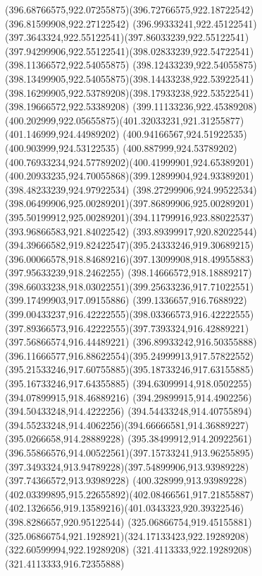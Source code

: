{{{{				\curveto(396.68766575,922.07255875)(396.72766575,922.18722542)(396.81599908,922.27122542)
				\curveto(396.99333241,922.45122541)(397.3643324,922.55122541)(397.86033239,922.55122541)
				\curveto(397.94299906,922.55122541)(398.02833239,922.54722541)(398.11366572,922.54055875)
				\curveto(398.12433239,922.54055875)(398.13499905,922.54055875)(398.14433238,922.53922541)
				\curveto(398.16299905,922.53789208)(398.17933238,922.53522541)(398.19666572,922.53389208)
				\curveto(399.11133236,922.45389208)(400.202999,922.05655875)(401.32033231,921.31255877)
				\lineto(401.146999,924.44989202)
				\lineto(400.94166567,924.51922535)
				\lineto(400.903999,924.53122535)
				\curveto(400.887999,924.53789202)(400.76933234,924.57789202)(400.41999901,924.65389201)
				\curveto(400.20933235,924.70055868)(399.12899904,924.93389201)(398.48233239,924.97922534)
				\curveto(398.27299906,924.99522534)(398.06499906,925.00289201)(397.86899906,925.00289201)
				\curveto(395.50199912,925.00289201)(394.11799916,923.88022537)(393.96866583,921.84022542)
				\curveto(393.89399917,920.82022544)(394.39666582,919.82422547)(395.24333246,919.30689215)
				\curveto(396.00066578,918.84689216)(397.13099908,918.49955883)(397.95633239,918.2462255)
				\lineto(398.14666572,918.18889217)
				\curveto(398.66033238,918.03022551)(399.25633236,917.71022551)(399.17499903,917.09155886)
				\curveto(399.1336657,916.7688922)(399.00433237,916.42222555)(398.03366573,916.42222555)
				\curveto(397.89366573,916.42222555)(397.7393324,916.42889221)(397.56866574,916.44489221)
				\curveto(396.89933242,916.50355888)(396.11666577,916.88622554)(395.24999913,917.57822552)
				\curveto(395.21533246,917.60755885)(395.18733246,917.63155885)(395.16733246,917.64355885)
				\lineto(394.63099914,918.0502255)
				\lineto(394.07899915,918.46889216)
				\lineto(394.29899915,914.4902256)
				\lineto(394.50433248,914.4222256)
				\lineto(394.54433248,914.40755894)
				\curveto(394.55233248,914.4062256)(394.66666581,914.36889227)(395.0266658,914.28889228)
				\curveto(395.38499912,914.20922561)(396.55866576,914.00522561)(397.15733241,913.96255895)
				\curveto(397.3493324,913.94789228)(397.54899906,913.93989228)(397.74366572,913.93989228)
				\curveto(400.328999,913.93989228)(402.03399895,915.22655892)(402.08466561,917.21855887)
				\curveto(402.1326656,919.13589216)(401.0343323,920.39322546)(398.8286657,920.95122544)
				\moveto(325.06866754,919.45155881)
				\curveto(325.06866754,921.1928921)(324.17133423,922.19289208)(322.60599994,922.19289208)
				\lineto(321.4113333,922.19289208)
				\lineto(321.4113333,916.72355888)
}}}}
